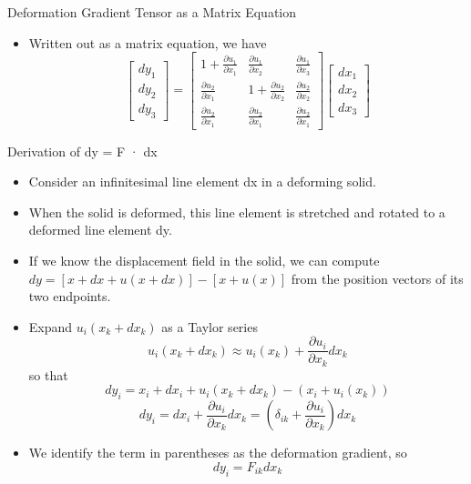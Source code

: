 \documentclass{beamer}
\begin{document}
\begin{frame}{Deformation Gradient Tensor as a Matrix Equation}
    \begin{itemize}
        \item   Written out as a matrix equation, we have
        $$
        \begin{bmatrix}
          dy_1 \\
          dy_2 \\
          dy_3
        \end{bmatrix} =
        \begin{bmatrix}
          1 + \frac{\partial u_1}{\partial x_1} & \frac{\partial u_1}{\partial x_2} & \frac{\partial u_1}{\partial x_3} \\
          \frac{\partial u_2}{\partial x_1} & 1 + \frac{\partial u_2}{\partial x_2} & \frac{\partial u_2}{\partial x_2} \\
          \frac{\partial u_2}{\partial x_1} & \frac{\partial u_2}{\partial x_1} & \frac{\partial u_2}{\partial x_1}
        \end{bmatrix}
        \begin{bmatrix}
          dx_1 \\
          dx_2 \\
          dx_3
        \end{bmatrix}
        $$
    \end{itemize}
\end{frame}

\begin{frame}{Derivation of  dy = F · dx}
  \begin{itemize}
    \item   Consider an infinitesimal line element dx in a deforming solid.
    \item   When the solid is deformed, this line element is stretched and rotated to a deformed line element dy.
    \item   If we know the displacement field in the solid, we can compute \(dy = [x + dx + u(x + dx)] - [x + u(x)]\) from the position vectors of its two endpoints.
    \item   Expand \(u_{i}(x_{k}+dx_{k})\) as a Taylor series
    $$ u_{i}(x_{k}+dx_{k}) \approx u_{i}(x_{k})+\frac{\partial u_{i}}{\partial x_{k}}dx_{k} $$
    so that
    $$ dy_{i}=x_{i}+dx_{i}+u_{i}(x_{k}+dx_{k})-(x_{i}+u_{i}(x_{k})) $$
    $$ dy_{i}=dx_{i}+\frac{\partial u_{i}}{\partial x_{k}}dx_{k}=(\delta_{ik}+\frac{\partial u_{i}}{\partial x_{k}})dx_{k} $$
    \item   We identify the term in parentheses as the deformation gradient, so
    $$ dy_{i}=F_{ik}dx_{k} $$
  \end{itemize}
\end{frame}
\end{document}
